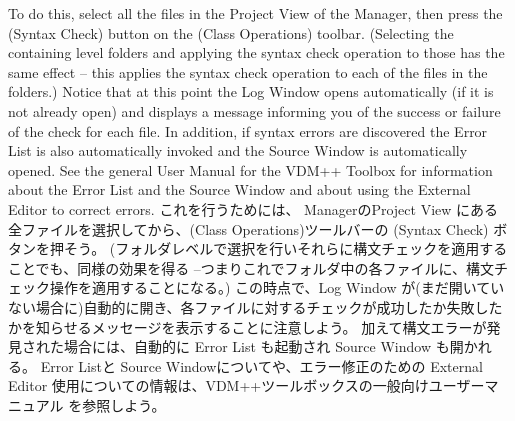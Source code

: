 \documentclass[\pformat,12pt]{jarticle}
\newcommand{\guicmd}[1]{{\sf #1}}
\begin{document}
To do this, select all the files in the \guicmd{Project View} 
of the \guicmd{Manager}, then press the 
(\guicmd{Syntax Check}) button on the (\guicmd{Class Operations})
toolbar. (Selecting the containing level folders and
applying the syntax check operation to those  has the same effect --
this applies the syntax check operation to each of the  files in the folders.) 
Notice that at this point the \guicmd{Log Window} opens automatically
(if it is not already open) and displays a message informing you of
the success or failure of the check for each file. In addition, if
syntax errors are discovered the \guicmd{Error List} is
also au\-to\-matically invoked and the \guicmd{Source Window} is
automatically opened. See the general User Manual for the VDM++
Toolbox \cite{UserManPP-CSK} for information about the \guicmd{Error List}
and the \guicmd{Source Window} and about using the \guicmd{External
  Editor} to correct errors.
これを行うためには、 \guicmd{Manager}の\guicmd{Project View} にある全ファイルを選択してから、(\guicmd{Class Operations})ツールバーの  (\guicmd{Syntax Check}) ボタンを押そう。
(フォルダレベルで選択を行いそれらに構文チェックを適用することでも、同様の効果を得る --つまりこれでフォルダ中の各ファイルに、構文チェック操作を適用することになる。) 
この時点で、\guicmd{Log Window} が(まだ開いていない場合に)自動的に開き、各ファイルに対するチェックが成功したか失敗したかを知らせるメッセージを表示することに注意しよう。
加えて構文エラーが発見された場合には、自動的に \guicmd{Error List} も起動され \guicmd{Source Window} も開かれる。 
 \guicmd{Error List}と \guicmd{Source Window}についてや、エラー修正のための \guicmd{External Editor} 使用についての情報は、VDM++ツールボックスの一般向けユーザーマニュアル \cite{UserManPP-CSK} を参照しよう。
\end{document}
